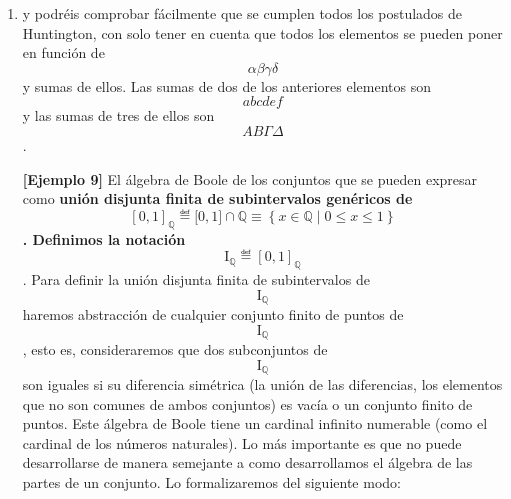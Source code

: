 \documentclass[
]{article}
\begin{document}
\begin{enumerate}
\def\labelenumi{\arabic{enumi}.}
\setcounter{enumi}{2}
\item
  y podréis comprobar fácilmente que se cumplen todos los postulados de
  Huntington, con solo tener en cuenta que todos los elementos se pueden
  poner en función de \[\alpha\beta\gamma\delta\]y sumas de ellos. Las
  sumas de dos de los anteriores elementos son \[abcdef\]y las sumas de
  tres de ellos son \[ΑΒ\Gamma\Delta\].

  \textbf{{[}Ejemplo 9{]}} El álgebra de Boole de los conjuntos que se
  pueden expresar como \textbf{unión dis\-junta finita de subintervalos
  genéricos de
  \[\left\lbrack {0,1} \right\rbrack_{\mathbb{Q}}≝{{\lbrack 0,1\rbrack \cap {\mathbb{Q}}} \equiv \left\{ {x \in {\mathbb{Q}} \mid 0 \leq x \leq 1} \right\}}\].
  Definimos la notación
  \[\mathbf{\mathrm{I}}_{\mathbb{Q}}≝\left\lbrack {0,1} \right\rbrack_{\mathbb{Q}}\]}.
  Para definir la unión disjunta finita de subintervalos de
  \[\mathbf{\mathrm{I}}_{\mathbb{Q}}\] haremos abs\-tracción de
  cualquier conjunto finito de puntos de
  \textbf{\[\mathbf{\mathrm{I}}_{\mathbb{Q}}\]}, esto es, consideraremos
  que dos subconjuntos de \[\mathbf{\mathrm{I}}_{\mathbb{Q}}\] son
  iguales si su diferencia simétrica (la unión de las diferencias, los
  elementos que no son comunes de ambos conjuntos) es vacía o un
  conjunto finito de puntos. Este álgebra de Boole tiene un cardinal
  infinito numerable (como el cardinal de los números naturales). Lo más
  importante es que no puede desarrollarse de manera semejante a como
  desarrolla\-mos el álgebra de las partes de un conjunto. Lo
  formalizaremos del siguiente modo:


\end{enumerate}
\end{document}

